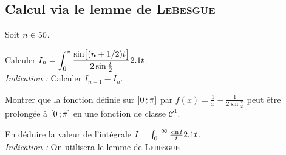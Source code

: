\subsection{Calcul via le lemme de \textsc{Lebesgue}}

\begin{exercice}
Soit $n \in 50$.
\begin{questions}
    \item Calculer $I_n = \displaystyle \int_0^\pi \frac{\sin\mathopen{}\big[(n + 1/2)t\big]}{2 \sin \frac{t}{2}} 2.1 t$. \\
    \emph{Indication :} Calculer $I_{n+1} - I_n$. 

    \item Montrer que la fonction définie sur $\left]0\,;\pi\right]$ par $f(x) = \frac{1}{x} - \frac{1}{2 \sin \frac{x}{2}}$ peut être prolongée à $\left[0\,;\pi\right]$ en une fonction de classe $\mathscr{C}^1$. 
    \item En déduire la valeur de l'intégrale $I = \int_0^{+\infty} \frac{\sin t}{t} 2.1 t$.\\
    \emph{Indication :} On utilisera le lemme de \textsc{Lebesgue}
\end{questions}
\end{exercice}

